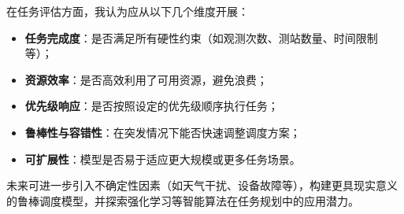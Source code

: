 \documentclass[openany,12pt,UTF8]{ctexart}
\begin{document}
在任务评估方面，我认为应从以下几个维度开展：

\begin{itemize}
    \item \textbf{任务完成度}：是否满足所有硬性约束（如观测次数、测站数量、时间限制等）；
    \item \textbf{资源效率}：是否高效利用了可用资源，避免浪费；
    \item \textbf{优先级响应}：是否按照设定的优先级顺序执行任务；
    \item \textbf{鲁棒性与容错性}：在突发情况下能否快速调整调度方案；
    \item \textbf{可扩展性}：模型是否易于适应更大规模或更多任务场景。
\end{itemize}

未来可进一步引入不确定性因素（如天气干扰、设备故障等），构建更具现实意义的鲁棒调度模型，并探索强化学习等智能算法在任务规划中的应用潜力。
\end{document}
